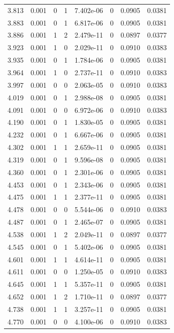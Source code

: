 \documentclass[preview]{standalone}
\begin{document}
{{{\begin{tabular}{L{1.2cm}C{1.2cm} C{0.3cm}C{0.5cm} C{1.4cm}C{1.4cm} C{1.4cm}C{1.4cm}}
  3.813  &  0.001  & 0     &  1 &  7.402e-06  & 0  & 0.0905 &  0.0381   \\ 
  3.883  &  0.001  & 0     &  1 &  6.817e-06  & 0  & 0.0905 &  0.0381   \\ 
  3.886  &  0.001  & 1     &  2 &  2.479e-11  & 0  & 0.0897 &  0.0377   \\ 
  3.923  &  0.001  & 1     &  0 &  2.029e-11  & 0  & 0.0910 &  0.0383   \\ 
  3.935  &  0.001  & 0     &  1 &  1.784e-06  & 0  & 0.0905 &  0.0381   \\ 
  3.964  &  0.001  & 1     &  0 &  2.737e-11  & 0  & 0.0910 &  0.0383   \\ 
  3.997  &  0.001  & 0     &  0 &  2.063e-05  & 0  & 0.0910 &  0.0383   \\ 
  4.019  &  0.001  & 0     &  1 &  2.988e-08  & 0  & 0.0905 &  0.0381   \\ 
  4.091  &  0.001  & 0     &  0 &  6.972e-06  & 0  & 0.0910 &  0.0383   \\ 
  4.190  &  0.001  & 0     &  1 &  1.830e-05  & 0  & 0.0905 &  0.0381   \\ 
  4.232  &  0.001  & 0     &  1 &  6.667e-06  & 0  & 0.0905 &  0.0381   \\ 
  4.302  &  0.001  & 1     &  1 &  2.659e-11  & 0  & 0.0905 &  0.0381   \\ 
  4.319  &  0.001  & 0     &  1 &  9.596e-08  & 0  & 0.0905 &  0.0381   \\ 
  4.360  &  0.001  & 0     &  1 &  2.301e-06  & 0  & 0.0905 &  0.0381   \\ 
  4.453  &  0.001  & 0     &  1 &  2.343e-06  & 0  & 0.0905 &  0.0381   \\ 
  4.475  &  0.001  & 1     &  1 &  2.377e-11  & 0  & 0.0905 &  0.0381   \\ 
  4.478  &  0.001  & 0     &  0 &  5.544e-06  & 0  & 0.0910 &  0.0383   \\ 
  4.487  &  0.001  & 0     &  1 &  2.465e-07  & 0  & 0.0905 &  0.0381   \\ 
  4.538  &  0.001  & 1     &  2 &  2.049e-11  & 0  & 0.0897 &  0.0377   \\ 
  4.545  &  0.001  & 0     &  1 &  5.402e-06  & 0  & 0.0905 &  0.0381   \\ 
  4.601  &  0.001  & 1     &  1 &  4.614e-11  & 0  & 0.0905 &  0.0381   \\ 
  4.611  &  0.001  & 0     &  0 &  1.250e-05  & 0  & 0.0910 &  0.0383   \\ 
  4.645  &  0.001  & 1     &  1 &  5.357e-11  & 0  & 0.0905 &  0.0381   \\ 
  4.652  &  0.001  & 1     &  2 &  1.710e-11  & 0  & 0.0897 &  0.0377   \\ 
  4.738  &  0.001  & 1     &  1 &  3.257e-11  & 0  & 0.0905 &  0.0381   \\ 
  4.770  &  0.001  & 0     &  0 &  4.100e-06  & 0  & 0.0910 &  0.0383   \\ 
\hline 
\end{tabular} 

}}}
\end{document}
